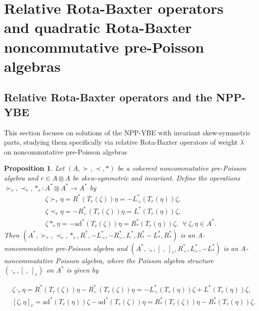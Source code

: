 \documentclass[12pt]{amsart}
\newtheorem{pro}[thm]{Proposition}
\theoremstyle{definition}
\begin{document}
\section{Relative Rota-Baxter operators and quadratic Rota-Baxter noncommutative pre-Poisson algebras }
\subsection{Relative Rota-Baxter operators and the NPP-YBE}
This section focuses on solutions of the NPP-YBE with invariant skew-symmetric parts, 
studying them specifically via relative Rota-Baxter operators of weight $\lambda$ on noncommutative pre-Poisson algebras


 \begin{pro}
Let $(A,\succ,\prec,\ast)$ be a coherent noncommutative pre-Poisson algebra and $r\in A\otimes A$ be skew-symmetric and invariant. Define the
operations $\succ_r,\prec_r,\ast_r:A^{*}\otimes A^{*}\longrightarrow A^{*}$ by
\begin{align}&\label{Apa1}\zeta\succ_{r}\eta=R_{\cdot}^{*}(T_{r}(\zeta))\eta=-L_{\prec}^{*}(T_{r}(\eta))\zeta,
\\&\label{Apa2}\zeta\prec_{r}\eta=-R_{\succ}^{*}(T_{r}(\zeta))\eta=L_{\cdot}^{*} (T_{r}(\eta))\zeta,\\&
\label{Apa3}\zeta\ast_{r}\eta=-\mathrm{ad}^{*} (T_{r}(\zeta))\eta=R_{\ast}^{*}(T_{r}(\eta))\zeta,~~\forall~\zeta,\eta\in A^{*}.
\end{align}
Then 
$(A^{*},\succ_r,\prec_r,\ast_r,R_{\cdot}^{*},-L_{\prec}^{*},-R_{\succ}^{*},L_{\cdot}^{*},R^{*}_{\ast}-L_{\ast}^{*},R^{*}_{\ast})$
is an A-noncommutative pre-Poisson algebra
and $(A^{*},\cdot_r,[ \ , \ ]_{r},R_{\prec}^{*}, L_{\succ}^{*},-L_{\ast}^{*})$ is an A-noncommutative Poisson algebra, where
the Poisson algebra structure $(\cdot_r,[ \ , \ ]_{r})$ on $A^{*}$ is
given by 
\begin{small}\begin{align}&\label{Apa4}\zeta\cdot_{r}\eta=R_{\cdot}^{*}(T_{r}(\zeta))\eta-R_{\succ}^{*}(T_{r}(\zeta))\eta
=-L_{\prec}^{*}(T_{r}(\eta))\zeta+L_{\cdot}^{*} (T_{r}(\eta))\zeta
,\\&\label{Apa5}
[ \zeta , \eta ]_{r}=\mathrm{ad}^{*} (T_{r}(\eta))\zeta-\mathrm{ad}^{*} (T_{r}(\zeta))\eta
=R_{\ast}^{*}(T_{r}(\zeta))\eta-R_{\ast}^{*}(T_{r}(\eta))\zeta.
\end{align}\end{small}
\end{pro}
\end{document}
